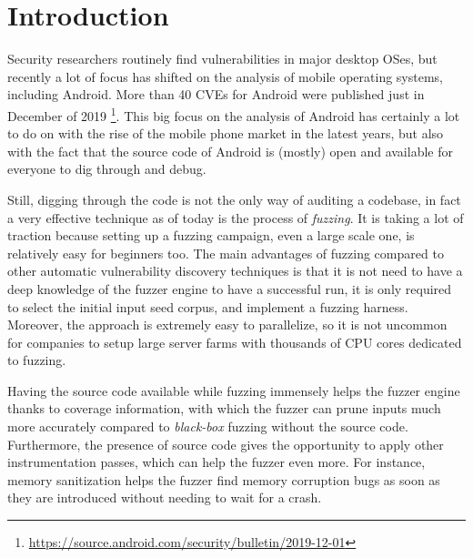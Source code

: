 \documentclass[a4paper,11pt,oneside]{report}
\begin{document}
\chapter{Introduction}

Security researchers routinely find vulnerabilities in major desktop OSes, but 
recently a lot of focus has shifted on the analysis of mobile operating 
systems, including Android.  More than 40 CVEs for Android were published just 
in December of 2019 
\footnote{\url{https://source.android.com/security/bulletin/2019-12-01}}.  This 
big focus on the analysis of Android has certainly a lot to do on with the rise 
of the mobile phone market in the latest years, but also with the fact that the 
source code of Android is (mostly) open and available for everyone to dig 
through and debug.

Still, digging through the code is not the only way of auditing a codebase, in 
fact a very effective technique as of today is the process of \emph{fuzzing}.  
It is taking a lot of traction because setting up a fuzzing campaign, even a 
large scale one, is relatively easy for beginners too. The main advantages of 
fuzzing compared to other automatic vulnerability discovery techniques is that 
it is not need to have a deep knowledge of the fuzzer engine to have a 
successful run, it is only required to select the initial input seed corpus, 
and implement a fuzzing harness. Moreover, the approach is extremely easy to 
parallelize, so it is not uncommon for companies to setup large server farms 
with thousands of CPU cores dedicated to fuzzing.

Having the source code available while fuzzing immensely helps the fuzzer 
engine thanks to coverage information, with which the fuzzer can prune inputs 
much more accurately compared to \emph{black-box} fuzzing without the source 
code.  Furthermore, the presence of source code gives the opportunity to apply 
other instrumentation passes, which can help the fuzzer even more.  For 
instance, memory sanitization helps the fuzzer find memory corruption bugs as 
soon as they are introduced without needing to wait for a crash. 
\end{document}
